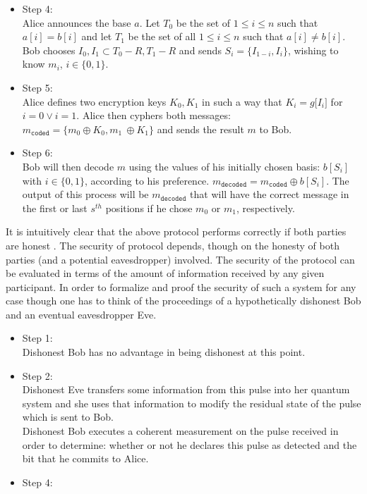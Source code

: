 \begin{refsection}
\begin{itemize}
		\item Step 4:\\
		Alice announces the base $a$. Let $T_0$ be the set of $1\leq i \leq n$ such that $a\left[i\right]=b\left[i\right]$ and let $T_1$ be the set of all $1\leq i \leq n$ such that $a\left[i\right]\ne b\left[i\right]$. Bob chooses $I_0,I_1\subset T_0-R, T_1-R$ and sends $S_i=\{I_{1-i},I_i\}$, wishing to know $m_i$, $i\in\{0,1\}$.
		\item Step 5:\\
		Alice defines two encryption keys $K_0,K_1$ in such a way that $K_i=g\big[I_i\big]$ for $i=0 \vee i=1$. Alice then cyphers both messages: $m_{\mathtt{coded}}=\{m_0\oplus K_0,m_1\ \oplus K_1\}$ and sends the result $m$ to Bob.
		\item Step 6:\\
		Bob will then decode $m$ using the values of his initially chosen basis:  $b\left[S_i\right]$ with $i\in\{0,1\}$, according to his preference. $m_{\mathtt{decoded}}=m_{\mathtt{coded}}\oplus b\left[S_i\right]$. The output of this process will be $m_{\mathtt{decoded}}$ that will have the correct message in the first or last $s^{th}$ positions if he chose $m_0$ or $m_1$, respectively.
	\end{itemize}
	It is intuitively clear that the above protocol performs correctly if both parties are honest \cite{Yao1995}. The security of protocol depends, though on the honesty of both parties (and a potential eavesdropper) involved. The security of the protocol can be evaluated in terms of the amount of information received by any given participant. In order to formalize and proof the security of such a system for any case though one has to think of the proceedings of a hypothetically dishonest Bob and an eventual eavesdropper Eve.
	\begin{itemize}
		\item Step 1:\\
		Dishonest Bob has no advantage in being dishonest at this point.
		\item Step 2:\\
		Dishonest Eve transfers some information from this pulse into her quantum system and she uses that information to modify the residual state of the pulse which is sent to Bob.\\
		Dishonest Bob executes a coherent measurement on the pulse received in order to determine: whether or not he declares this pulse as detected and the bit that he commits to Alice.
		\item Step 4:\\

\end{itemize}
\end{refsection}
